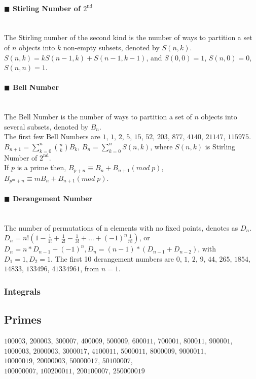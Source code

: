 \documentclass[10pt]{article}
\begin{document}
\paragraph{$\blacksquare$ Stirling Number of $\mathrm{2^{nd}}$}
\noindent \\
The Stirling number of the second kind is the number of ways to partition a set of $n$ objects into $k$ non-empty subsets, denoted by $S(n,k)$. \\
$S(n,k)=kS(n-1,k)+S(n-1,k-1)$, and $S(0,0)=1$, $S(n,0)=0$, $S(n,n)=1$.
\paragraph{$\blacksquare$ Bell Number}
\noindent \\
The Bell Number is the number of ways to partition a set of $n$ objects into several subsets, denoted by $B_{n}$. \\
The first few Bell Numbers are $1$, $1$, $2$, $5$, $15$, $52$, $203$, $877$, $4140$, $21147$, $115975$. \\
$B_{n+1}=\sum_{k=0}^{n} \binom{n}{k}B_k$, $B_n=\sum_{k=0}^{n}S(n,k)$, where $S(n,k)$ is Stirling Number of $\mathrm{2^{nd}}$. \\
If $p$ is a prime then, $B_{p+n} \equiv B_n+B_{n+1} (mod \; p)$, $B_{p^m+n} \equiv m B_n + B_{n+1} (mod \; p)$.
\paragraph{$\blacksquare$ Derangement Number}
\noindent \\
The number of permutations of n elements with no fixed points, denotes as $D_n$. \\
$D_n=n!(1-\frac{1}{1!}+\frac{1}{2!}-\frac{1}{3!}+\ldots +{(-1)}^n\frac{1}{n!})$, or $D_n=n*D_{n-1}+{(-1)}^n,D_n=(n-1)*(D_{n-1}+D_{n-2})$, with $D_1=1,D_2=1$.
The first 10 derangement numbers are $0$, $1$, $2$, $9$, $44$, $265$, $1854$, $14833$, $133496$, $41334961$, from $n=1$.
\subsubsection{Integrals}

\subsection{Primes}
\noindent
$100003$, $200003$, $300007$, $400009$, $500009$, $600011$, $700001$, $800011$, $900001$, \\
$1000003$, $2000003$, $3000017$, $4100011$, $5000011$, $8000009$, $9000011$, \\
$10000019$, $20000003$, $50000017$, $50100007$, \\
$100000007$, $100200011$, $200100007$, $250000019$
\end{document}
